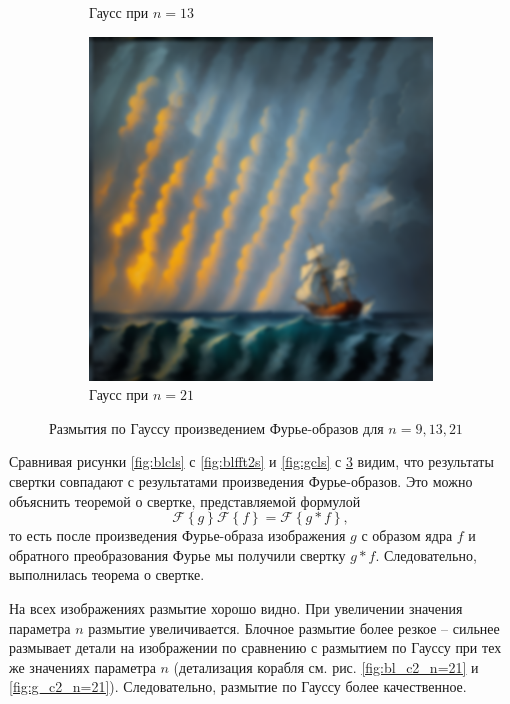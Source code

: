 \documentclass[a4paper, 12pt]{article}
\begin{document}
\begin{figure}[H]
\begin{subfigure}{0.30\textwidth}
            \caption{Гаусс при $n=13$}
            \label{fig:g_fft2_n=13}
        \end{subfigure}
        \begin{subfigure}{0.30\textwidth}
            \centering
            \includegraphics[width=\linewidth]{g_fft2_n=21.png}
            \caption{Гаусс при $n=21$}
            \label{fig:g_fft2_n=21}
        \end{subfigure}
        \caption{Размытия по Гауссу произведением Фурье-образов для $n=9,13,21$}
        \label{fig:gfft2s}
    \end{figure}


    Сравнивая рисунки \ref{fig:blcls} с \ref{fig:blfft2s}
    и \ref{fig:gcls} с \ref{fig:gfft2s} видим, что результаты свертки совпадают с результатами произведения
    Фурье-образов. Это можно объяснить теоремой о свертке, представляемой формулой
    $$
    \mathcal{F}\left\{g\right\}\mathcal{F}\left\{f\right\}=\mathcal{F}\left\{g*f\right\},
    $$
    то есть после произведения Фурье-образа изображения $g$ с образом ядра $f$ и обратного преобразования Фурье
    мы получили свертку $g*f$. Следовательно, выполнилась теорема о свертке.


    На всех изображениях размытие хорошо видно. При увеличении значения параметра $n$ размытие увеличивается.
    Блочное размытие более резкое -- сильнее размывает детали на изображении по сравнению с размытием по Гауссу при тех же значениях параметра $n$
    (детализация корабля см. рис. \ref{fig:bl_c2_n=21} и \ref{fig:g_c2_n=21}). Следовательно, размытие по Гауссу более качественное.
\end{document}
